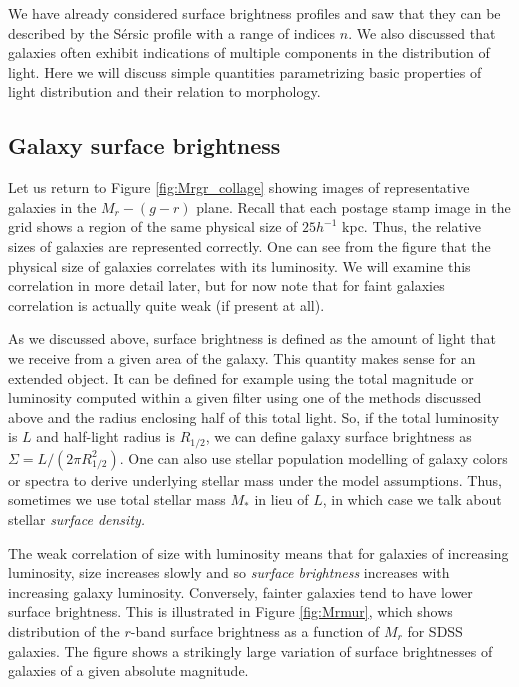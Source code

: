 We have already considered surface brightness profiles and saw that they can be described by the S\'ersic profile with a range of indices $n$. We also discussed that galaxies often exhibit indications of multiple components in the distribution of light. Here we will discuss simple quantities parametrizing basic properties of light distribution and their relation to morphology. 

\subsection{Galaxy surface brightness}

Let us return to Figure \ref{fig:Mrgr_collage} showing images of representative galaxies in the $M_r-(g-r)$ plane. Recall that each postage stamp image in the grid shows a region of the same physical size of $25h^{-1}$ kpc. Thus, the relative sizes of galaxies are represented correctly. One can see from the 
figure that the physical size of galaxies correlates with its luminosity. We will examine this correlation in more detail later, but for now note that for faint galaxies correlation is actually quite weak (if present at all).

As we discussed above, surface brightness is defined as the amount of light that we receive from a given area of the galaxy. This quantity makes sense for an extended object. It can be defined for example using the total magnitude or luminosity computed within a given filter using one of the methods discussed above and the radius enclosing half of this total light. So, if the total luminosity is $L$ and half-light radius is $R_{1/2}$, we can define galaxy surface brightness as $\Sigma=L/(2\pi R_{1/2}^2)$.  One can also use stellar population modelling of galaxy colors or spectra to derive underlying stellar mass under the model assumptions. Thus, sometimes we use total stellar mass $M_\ast$ in lieu of $L$, in which case we talk about stellar {\it surface density.}

 The weak correlation of size with luminosity means that for galaxies of increasing luminosity, size increases slowly and so {\it surface brightness} increases with increasing galaxy luminosity. Conversely, fainter galaxies tend to have lower surface brightness. This is illustrated in Figure \ref{fig:Mrmur}, which shows distribution of the $r$-band surface brightness as a function of $M_r$ for SDSS galaxies. The figure shows a strikingly large variation of surface brightnesses of galaxies of a given absolute magnitude. 


